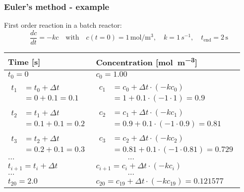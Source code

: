 \begin{frame}
  \frametitle{Euler's method - example}
  First order reaction in a batch reactor:
  \[
    \frac{dc}{dt} = -kc \quad \text{with} \quad c(t=0) = 1\, \si{\mole\per\cubic\meter}, \quad k = 1\, \si{s^{-1}}, \quad t_\text{end} = 2\, \si{\second}
  \]
  \pause
  \footnotesize\selectfont
  \begin{longtable}{p{}p{}}
  \hline
    Time [\si{\second}] & Concentration [\si{\mole\per\cubic\meter}] \\ \hline
    $t_0 = 0$                                 & $c_0 = 1.00$ \\
    $\begin{aligned}t_1 &= t_0 + \Delta t\\ &= 0 + 0.1 = 0.1\end{aligned}$    & $\begin{aligned}c_1 &= c_0 + \Delta t \cdot (-kc_0) \\ &= 1 + 0.1 \cdot (-1 \cdot 1) = 0.9\end{aligned}$ \\
    $\begin{aligned}t_2 &= t_1 + \Delta t\\ &= 0.1 + 0.1 = 0.2\end{aligned}$  & $\begin{aligned}c_2 &= c_1 + \Delta t \cdot (-kc_1)\\ &= 0.9 + 0.1 \cdot (-1 \cdot 0.9) = 0.81\end{aligned}$ \\ 
    $\begin{aligned} t_3 &= t_2 + \Delta t \\ &= 0.2 + 0.1 = 0.3\end{aligned}$  & $\begin{aligned}c_3 &= c_2 + \Delta t \cdot (-kc_2)\\ &= 0.81 + 0.1 \cdot (-1 \cdot 0.81) = 0.729 \end{aligned}$ \\ 
    \centering$\ldots$                                  & $\quad \quad \quad \quad \ldots$ \\
    $t_{i+1} = t_i + \Delta t$                & $c_{i+1} = c_i + \Delta t \cdot (-k c_i) $ \\
    \centering$\ldots$ & $\quad \quad \quad \quad \ldots$ \\
    $t_{20} = 2.0 $ & $c_{20} = c_{19} + \Delta t \cdot (-k c_{19}) = 0.121577$ \\
    \hline
  \end{longtable}
\end{frame}

